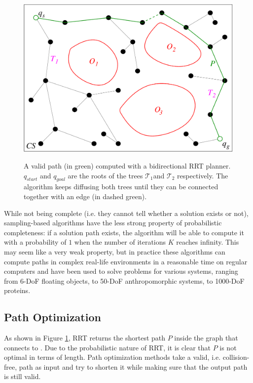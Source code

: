 \begin{figure}
  \centering
      {\includegraphics[width = 0.8\linewidth]
        {src/chap1-path-optimization/rrt.pdf}}
      \caption{A valid path (in green) computed with a bidirectional
        RRT planner. $q_{start}$ and $q_{goal}$ are the roots of the
        trees $\mathcal{T}_{1}$and $\mathcal{T}_{2}$ respectively. The
        algorithm keeps diffusing both trees until they can be
        connected together with an edge (in dashed green).}
      \label{fig:chap1-rrt}
\end{figure}

While not being complete (i.e. they cannot tell whether a solution
exists or not), sampling-based algorithms have the less strong
property of probabilistic completeness: if a solution path exists, the
algorithm will be able to compute it with a probability of $1$ when
the number of iterations $K$ reaches infinity. This may seem like a
very weak property, but in practice these algorithms can compute paths
in complex real-life environments in a reasonable time on regular
computers and have been used to solve problems for various systems,
ranging from 6-DoF floating objects, to 50-DoF anthropomorphic
systems, to 1000-DoF proteins.

\subsection{Path Optimization}
\label{subsec:chap1-path-optimization}

As shown in Figure \ref{fig:chap1-rrt}, RRT returns the shortest path
$P$ inside the graph that connects  to . Due to
the probabilistic nature of RRT, it is clear that $P$ is not optimal
in terms of length. Path optimization methods take a valid,
i.e. collision-free, path as input and try to shorten it while making
sure that the output path is still valid.

